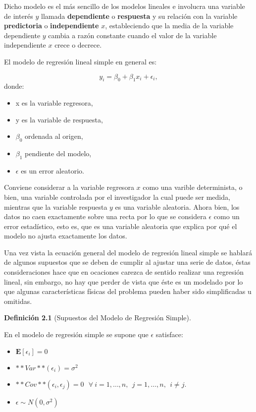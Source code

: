 \documentclass[a4paper,oneside,openany]{book}
\providecommand{\tightlist}{%
  \setlength{\itemsep}{0pt}\setlength{\parskip}{0pt}}
\begin{document}
Dicho modelo es el más sencillo de los modelos lineales e involucra una
variable de interés \(y\) llamada \textbf{dependiente} o
\textbf{respuesta} y su relación con la variable \textbf{predictoria} o
\textbf{independiente} \(x\), estableciendo que la media de la variable
dependiente \(y\) cambia a razón constante cuando el valor de la
variable independiente \(x\) crece o decrece.

El modelo de regresión lineal simple en general es:

\[y_{i}=\beta_{0}+\beta_{1}x_{i}+\epsilon_{i},\] donde:

\begin{itemize}
\item
  x es la variable regresora,
\item
  y es la variable de respuesta,
\item
  \(\beta_{0}\) ordenada al origen,
\item
  \(\beta_{1}\) pendiente del modelo,
\item
  \(\epsilon\) es un error aleatorio.
\end{itemize}

Conviene considerar a la variable regresora \(x\) como una varible
determinista, o bien, una variable controlada por el investigador la
cual puede ser medida, mientras que la variable respuesta \(y\) es una
variable aleatoria. Ahora bien, los datos no caen exactamente sobre una
recta por lo que se considera \(\epsilon\) como un error estadístico,
esto es, que es una variable aleatoria que explica por qué el modelo no
ajusta exactamente los datos.

Una vez vista la ecuación general del modelo de regresión lineal simple
se hablará de algunos supuestos que se deben de cumplir al ajustar una
serie de datos, éstas consideraciones hace que en ocaciones carezca de
sentido realizar una regresión lineal, sin embargo, no hay que perder de
vista que éste es un modelado por lo que algunas características físicas
del problema pueden haber sido simplificadas u omitidas.

\textbf{Definición 2.1} (Supuestos del Modelo de Regresión Simple).

En el modelo de regresión simple se supone que \(\epsilon\) satisface:

\begin{itemize}
\tightlist
\item
  \(\mathbf{E}[\epsilon_{i}]=0\)
\item
  \(**Var**(\epsilon_{i})=\sigma^2\)
\item
  \(**Cov**(\epsilon_{i},\epsilon_{j})= 0 \  \ \ \forall \ i = 1, \ldots, n, \ \  j=1, \ldots, n, \ \  i \neq j.\)
\item
  \(\epsilon \sim N(0,\sigma^2)\)
\end{itemize}
\end{document}
